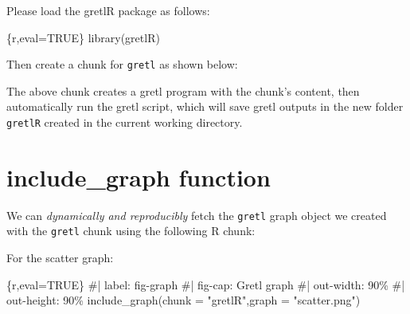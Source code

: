 \documentclass[
  letterpaper,
  DIV=11,
  numbers=noendperiod]{scrartcl}
\newenvironment{Shaded}{\begin{snugshade}}{\end{snugshade}}
\newcommand{\AttributeTok}[1]{\textcolor[rgb]{0.40,0.45,0.13}{#1}}
\newcommand{\CommentTok}[1]{\textcolor[rgb]{0.37,0.37,0.37}{#1}}
\newcommand{\FunctionTok}[1]{\textcolor[rgb]{0.28,0.35,0.67}{#1}}
\newcommand{\InformationTok}[1]{\textcolor[rgb]{0.37,0.37,0.37}{#1}}
\newcommand{\NormalTok}[1]{\textcolor[rgb]{0.00,0.23,0.31}{#1}}
\newcommand{\StringTok}[1]{\textcolor[rgb]{0.13,0.47,0.30}{#1}}
\begin{document}
Please load the gretlR package as follows:

\begin{Shaded}
\begin{Highlighting}[]
\InformationTok{\textasciigrave{}\textasciigrave{}\textasciigrave{}\{r,eval=TRUE\}}
\FunctionTok{library}\NormalTok{(gretlR)}
\InformationTok{\textasciigrave{}\textasciigrave{}\textasciigrave{}}
\end{Highlighting}
\end{Shaded}

Then create a chunk for \texttt{gretl} as shown below:

The above chunk creates a gretl program with the chunk's content, then
automatically run the gretl script, which will save gretl outputs in the
new folder \texttt{gretlR} created in the current working directory.

\hypertarget{include_graph-function}{%
\section{include\_graph function}\label{include_graph-function}}

We can \emph{dynamically and reproducibly} fetch the \texttt{gretl}
graph object we created with the \texttt{gretl} chunk using the
following R chunk:

For the scatter graph:

\begin{Shaded}
\begin{Highlighting}[]
\InformationTok{\textasciigrave{}\textasciigrave{}\textasciigrave{}\{r,eval=TRUE\}}
\CommentTok{\#| label: fig{-}graph}
\CommentTok{\#| fig{-}cap: Gretl graph}
\CommentTok{\#| out{-}width: 90\%}
\CommentTok{\#| out{-}height: 90\%}
\FunctionTok{include\_graph}\NormalTok{(}\AttributeTok{chunk =} \StringTok{"gretlR"}\NormalTok{,}\AttributeTok{graph =} \StringTok{"scatter.png"}\NormalTok{)}
\InformationTok{\textasciigrave{}\textasciigrave{}\textasciigrave{}}
\end{Highlighting}
\end{Shaded}
\end{document}
